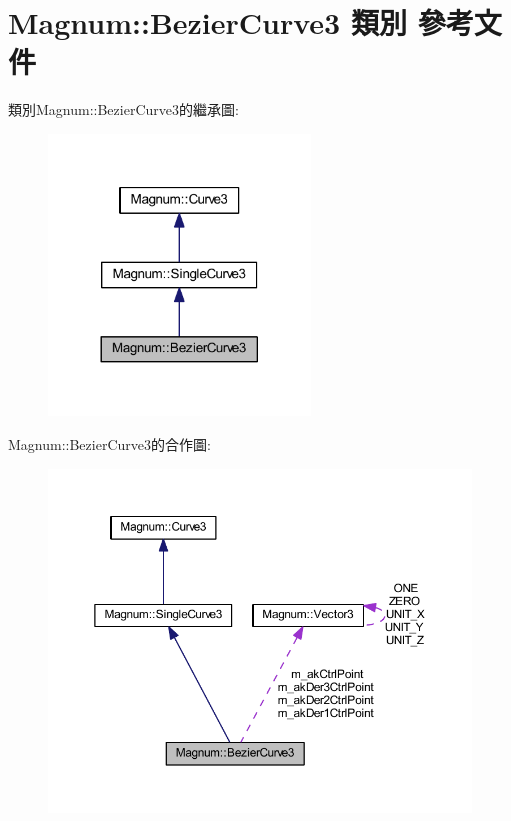 \hypertarget{class_magnum_1_1_bezier_curve3}{}\section{Magnum\+:\+:Bezier\+Curve3 類別 參考文件}
\label{class_magnum_1_1_bezier_curve3}


類別\+Magnum\+:\+:Bezier\+Curve3的繼承圖\+:\nopagebreak
\begin{figure}[H]
\begin{center}
\leavevmode
\includegraphics[width=197pt]{class_magnum_1_1_bezier_curve3__inherit__graph}
\end{center}
\end{figure}


Magnum\+:\+:Bezier\+Curve3的合作圖\+:\nopagebreak
\begin{figure}[H]
\begin{center}
\leavevmode
\includegraphics[width=350pt]{class_magnum_1_1_bezier_curve3__coll__graph}
\end{center}
\end{figure}
